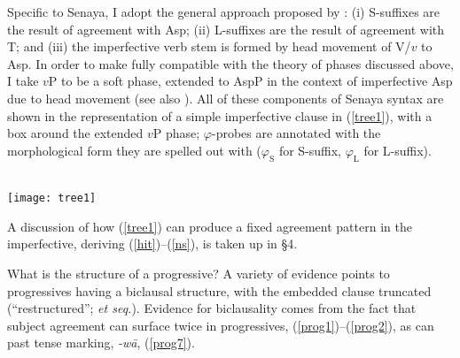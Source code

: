 \documentclass[output=paper
,modfonts
,nonflat]{langsci/langscibook}
\begin{document}
Specific to Senaya, I adopt the general approach proposed by \citet{KalinvanUrk15}: (i) S-suffixes are the result of agreement with Asp; (ii) L-suffixes are the result of agreement with T; and (iii) the imperfective verb stem is formed by head movement of V/$v$ to Asp. In order to make  \citet{KalinvanUrk15} fully compatible with the theory of phases discussed above, I take $v$P to be a soft phase, extended to AspP in the context of imperfective Asp due to head movement (see also \citealt{Kalin15}). All of these components of Senaya syntax are shown in the representation of a simple imperfective clause in (\ref{tree1}), with a box around the extended $v$P phase; $\varphi$-probes are annotated with the morphological form they are spelled out with ($\varphi_\textrm{S}$ for S-suffix, $\varphi_\textrm{L}$ for L-suffix).


\begin{figure}[!h]
	\begin{exe} 
	\end{exe}
\end{figure}

\ea \label{tree1} \- \\ \texttt{[image: tree1]}
\z

\noindent A discussion of how (\ref{tree1}) can produce a fixed agreement pattern in the imperfective, deriving (\ref{hit})--(\ref{ns}), is taken up in \S4.

What is the structure of a progressive? A variety of evidence points to progressives having a biclausal structure, with the embedded clause truncated (``restructured''; \citealt{Wurmbrand98} \textit{et seq.}). Evidence for biclausality comes from the fact that subject agreement can surface twice in progressives, (\ref{prog1})--(\ref{prog2}), as can past tense marking, \textit{-w\=a}, (\ref{prog7}).
\end{document}
